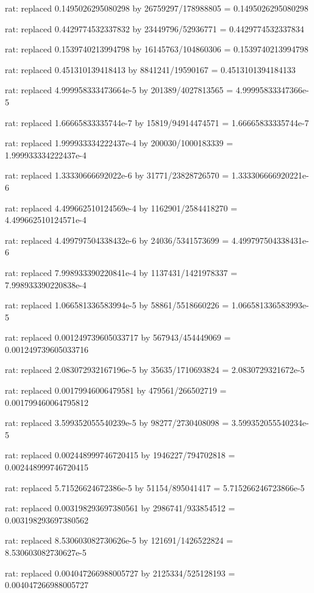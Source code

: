 \documentclass[a4paper,10pt]{article}
\begin{document}
\begin{eulernotebook}
\begin{eulercomment}
\begin{eulercomment}
\begin{eulercomment}
\begin{eulercomment}
\begin{eulercomment}
\begin{eulercomment}
\begin{eulercomment}
\begin{eulercomment}
\begin{eulercomment}
\begin{eulercomment}
\begin{eulercomment}
\begin{eulercomment}
\begin{eulercomment}
\begin{eulercomment}
\begin{eulercomment}
\begin{eulercomment}
\begin{euleroutput}
  rat: replaced 0.1495026295080298 by 26759297/178988805 = 0.1495026295080298
  
  rat: replaced 0.4429774532337832 by 23449796/52936771 = 0.4429774532337834
  
  rat: replaced 0.1539740213994798 by 16145763/104860306 = 0.1539740213994798
  
  rat: replaced 0.451310139418413 by 8841241/19590167 = 0.4513101394184133
  
  rat: replaced 4.999958333473664e-5 by 201389/4027813565 = 4.99995833347366e-5
  
  rat: replaced 1.66665833335744e-7 by 15819/94914474571 = 1.66665833335744e-7
  
  rat: replaced 1.999933334222437e-4 by 200030/1000183339 = 1.999933334222437e-4
  
  rat: replaced 1.33330666692022e-6 by 31771/23828726570 = 1.333306666920221e-6
  
  rat: replaced 4.499662510124569e-4 by 1162901/2584418270 = 4.499662510124571e-4
  
  rat: replaced 4.499797504338432e-6 by 24036/5341573699 = 4.499797504338431e-6
  
  rat: replaced 7.998933390220841e-4 by 1137431/1421978337 = 7.998933390220838e-4
  
  rat: replaced 1.066581336583994e-5 by 58861/5518660226 = 1.066581336583993e-5
  
  rat: replaced 0.001249739605033717 by 567943/454449069 = 0.001249739605033716
  
  rat: replaced 2.083072932167196e-5 by 35635/1710693824 = 2.0830729321672e-5
  
  rat: replaced 0.00179946006479581 by 479561/266502719 = 0.001799460064795812
  
  rat: replaced 3.599352055540239e-5 by 98277/2730408098 = 3.599352055540234e-5
  
  rat: replaced 0.002448999746720415 by 1946227/794702818 = 0.002448999746720415
  
  rat: replaced 5.71526624672386e-5 by 51154/895041417 = 5.715266246723866e-5
  
  rat: replaced 0.003198293697380561 by 2986741/933854512 = 0.003198293697380562
  
  rat: replaced 8.530603082730626e-5 by 121691/1426522824 = 8.530603082730627e-5
  
  rat: replaced 0.004047266988005727 by 2125334/525128193 = 0.004047266988005727
  

\end{euleroutput}
\end{eulercomment}
\end{eulercomment}
\end{eulercomment}
\end{eulercomment}
\end{eulercomment}
\end{eulercomment}
\end{eulercomment}
\end{eulercomment}
\end{eulercomment}
\end{eulercomment}
\end{eulercomment}
\end{eulercomment}
\end{eulercomment}
\end{eulercomment}
\end{eulercomment}
\end{eulercomment}
\end{eulernotebook}
\end{document}
